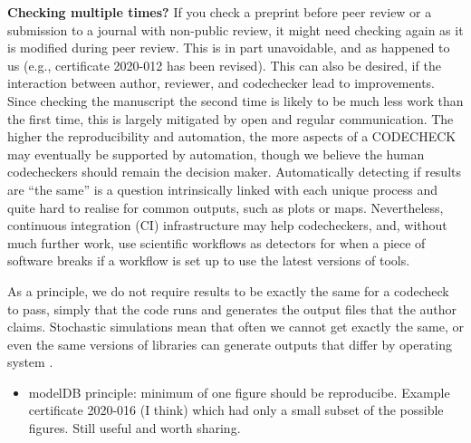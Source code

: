 \documentclass[12pt]{article}
\begin{document}
\textbf{Checking multiple times?} If you check a preprint before peer
review or a submission to a journal with non-public review, it might
need checking again as it is modified during peer review.  This is in
part unavoidable, and as happened to us (e.g., certificate 2020-012
\cite{cert-2020-012} has been revised). This can also be desired, if
the interaction between author, reviewer, and codechecker lead to
improvements.  Since checking the manuscript the second time is likely
to be much less work than the first time, this is largely mitigated by
open and regular communication.  The higher the reproducibility and
automation, the more aspects of a CODECHECK may eventually be
supported by automation, though we believe the human codecheckers
should remain the decision maker.  Automatically detecting if results
are ``the same'' is a question intrinsically linked with each unique
process and quite hard to realise for common outputs, such as plots or
maps.  Nevertheless, continuous integration (CI) infrastructure may
help codecheckers, and, without much further work, use scientific
workflows as detectors for when a piece of software breaks if a
workflow is set up to use the latest versions of tools.

As a principle, we do not require results to be exactly the same for a
codecheck to pass, simply that the code runs and generates the output
files that the author claims. Stochastic simulations mean that often
we cannot get exactly the same, or even the same versions of libraries
can generate outputs that differ by operating system
\cite{Gronenschild2012-pp}.

\begin{itemize}
\item modelDB principle: minimum of one figure should be reproducibe.
  Example certificate 2020-016 (I think) which had only a small subset
  of the possible figures. Still useful and worth sharing.
\end{itemize}
\end{document}
